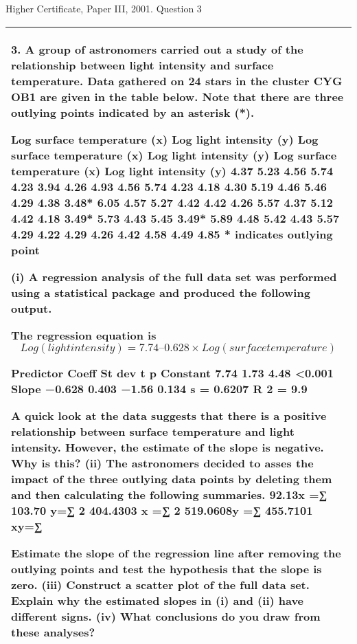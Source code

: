 \documentclass[a4paper,12pt]{article}
\begin{document}
Higher Certificate, Paper III, 2001. Question 3

\begin{table}[ht!]
     


\centering
     


\begin{tabular}{|p{15cm}|}
     


\hline 

3. A group of astronomers carried out a study of the relationship between light intensity and surface temperature.  
Data gathered on 24 stars in the cluster CYG OB1 are given in the table below.  Note that there are three outlying points indicated by an asterisk (*). 
 
Log surface temperature (x) 
Log light intensity  (y) 
Log surface temperature (x) 
Log light intensity  (y) 
Log surface temperature (x) 
Log light intensity  (y) 4.37 5.23 4.56 5.74 4.23 3.94 4.26 4.93 4.56 5.74 4.23 4.18 4.30 5.19 4.46 5.46 4.29 4.38  3.48* 6.05 4.57 5.27 4.42 4.42 4.26 5.57 4.37 5.12 4.42 4.18  3.49* 5.73 4.43 5.45  3.49* 5.89 4.48 5.42 4.43 5.57 4.29 4.22 4.29 4.26 4.42 4.58 4.49 4.85 * indicates outlying point 
 
(i) A regression analysis of the full data set was performed using a statistical package and produced the following output. 
 
     The regression equation is      \[Log (light intensity)  =  7.74  –  0.628 × Log (surface temperature) \]
 
Predictor Coeff St dev t p   Constant 7.74 1.73   4.48 <0.001   Slope −0.628 0.403 −1.56 0.134 s = 0.6207 R 2 = 9.9%
 
A quick look at the data suggests that there is a positive relationship between surface temperature and light intensity.  
However, the estimate of the slope is negative.  Why is this?  
 (ii) The astronomers decided to asses the impact of the three outlying data points by deleting them and then calculating the following summaries. 
 92.13x =∑   103.70 y=∑ 2 404.4303 x =∑ 2 519.0608y =∑ 455.7101 xy=∑  
 
Estimate the slope of the regression line after removing the outlying points and test the hypothesis that the slope is zero.  
 (iii) Construct a scatter plot of the full data set.  Explain why the estimated slopes in (i) and (ii) have different signs.  
 (iv) What conclusions do you draw from these analyses?  

 
\\ \hline



\end{tabular}
    


\end{table}
\end{document}
